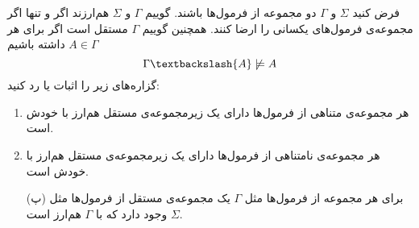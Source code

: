 فرض کنید $\Sigma$ و $\Gamma$ دو مجموعه از فرمول‌ها باشند. گوییم $\Gamma$ و $\Sigma$ هم‌ارزند اگر و تنها اگر مجموعه‌ی فرمول‌های یکسانی را ارضا کنند. همچنین گوییم $\Gamma$ مستقل است اگر برای هر $A\in\Gamma$ داشته باشیم
$$
\Gamma\textbackslash\{A\}\not\models A
$$
گزاره‌های زیر را اثبات یا رد کنید:
\begin{enumerate}
\item
هر مجموعه‌ی متناهی از فرمول‌ها دارای یک زیرمجموعه‌ی مستقل هم‌ارز با خودش است.
\item
هر مجموعه‌ی نامتناهی از فرمول‌ها دارای یک زیرمجموعه‌ی مستقل هم‌ارز با خودش است.
\item[(پ)]
برای هر مجموعه از فرمول‌ها مثل $\Gamma$ یک مجموعه‌ی مستقل از فرمول‌ها مثل $\Sigma$ وجود دارد که با $\Gamma$ هم‌ارز است.
\end{enumerate}\quad\vspace{-9mm}
